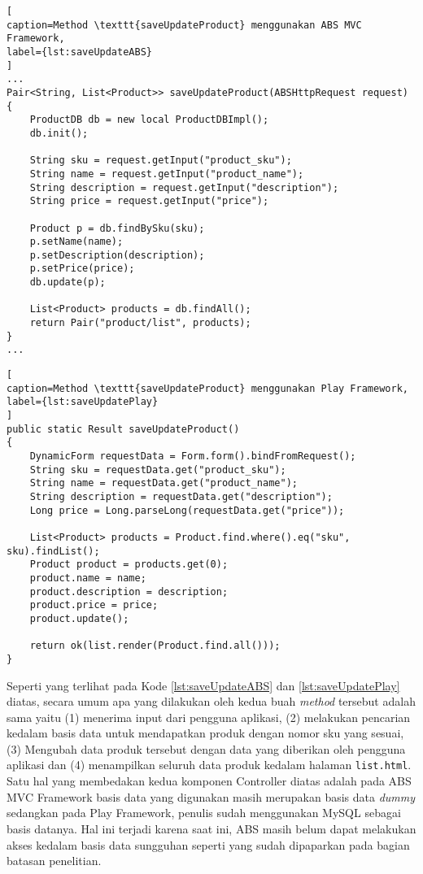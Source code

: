 \begin{lstlisting}[
caption=Method \texttt{saveUpdateProduct} menggunakan ABS MVC Framework,
label={lst:saveUpdateABS}
]
...
Pair<String, List<Product>> saveUpdateProduct(ABSHttpRequest request)
{
	ProductDB db = new local ProductDBImpl();
	db.init();
	
	String sku = request.getInput("product_sku");
	String name = request.getInput("product_name");
	String description = request.getInput("description");
	String price = request.getInput("price");
	
	Product p = db.findBySku(sku);
	p.setName(name);
	p.setDescription(description);
	p.setPrice(price);
	db.update(p);
	
	List<Product> products = db.findAll();
	return Pair("product/list", products);
}
...
\end{lstlisting}

\begin{lstlisting}[
caption=Method \texttt{saveUpdateProduct} menggunakan Play Framework,
label={lst:saveUpdatePlay}
]
public static Result saveUpdateProduct()
{
    DynamicForm requestData = Form.form().bindFromRequest();
    String sku = requestData.get("product_sku");
    String name = requestData.get("product_name");
    String description = requestData.get("description");
    Long price = Long.parseLong(requestData.get("price"));

    List<Product> products = Product.find.where().eq("sku", sku).findList();
    Product product = products.get(0);
    product.name = name;
    product.description = description;
    product.price = price;
    product.update();

    return ok(list.render(Product.find.all()));
}
\end{lstlisting}

Seperti yang terlihat pada Kode \ref{lst:saveUpdateABS} dan \ref{lst:saveUpdatePlay} diatas, secara umum apa yang dilakukan oleh kedua buah \textit{method} tersebut adalah sama yaitu (1) menerima input dari pengguna aplikasi, (2) melakukan pencarian kedalam basis data untuk mendapatkan produk dengan nomor sku yang sesuai, (3) Mengubah data produk tersebut dengan data yang diberikan oleh pengguna aplikasi dan (4) menampilkan seluruh data produk kedalam halaman \texttt{list.html}. Satu hal yang membedakan kedua komponen Controller diatas adalah pada ABS MVC Framework basis data yang digunakan masih merupakan basis data \textit{dummy} sedangkan pada Play Framework, penulis sudah menggunakan MySQL sebagai basis datanya. Hal ini terjadi karena saat ini, ABS masih belum dapat melakukan akses kedalam basis data sungguhan seperti yang sudah dipaparkan pada bagian batasan penelitian.\\

